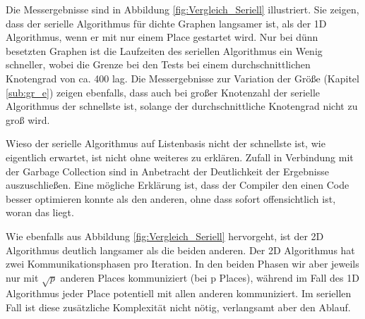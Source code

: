 Die Messergebnisse sind in Abbildung \ref{fig:Vergleich_Seriell} illustriert. Sie zeigen, dass der serielle Algorithmus für dichte Graphen langsamer ist, als der 1D Algorithmus, wenn er mit nur einem Place gestartet wird. Nur bei dünn besetzten Graphen ist die Laufzeiten des seriellen Algorithmus ein Wenig schneller, wobei die Grenze bei den Tests bei einem durchschnittlichen Knotengrad von ca. 400 lag. Die Messergebnisse zur Variation der Größe (Kapitel \ref{sub:gr_e}) zeigen ebenfalls, dass auch bei großer Knotenzahl der serielle Algorithmus der schnellste ist, solange der durchschnittliche Knotengrad nicht zu groß wird.

Wieso der serielle Algorithmus auf Listenbasis nicht der schnellste ist, wie eigentlich erwartet, ist nicht ohne weiteres zu erklären. Zufall in Verbindung mit der Garbage Collection sind in Anbetracht der Deutlichkeit der Ergebnisse auszuschließen. Eine mögliche Erklärung ist, dass der Compiler den einen Code besser optimieren konnte als den anderen, ohne dass sofort offensichtlich ist, woran das liegt.

Wie ebenfalls aus Abbildung \ref{fig:Vergleich_Seriell} hervorgeht, ist der 2D Algorithmus deutlich langsamer als die beiden anderen. Der 2D Algorithmus hat zwei Kommunikationsphasen pro Iteration. In den beiden Phasen wir aber jeweils nur mit $\sqrt{p}$ anderen Places kommuniziert (bei p Places)\cite{Buluc:2011}, während im Fall des 1D Algorithmus jeder Place potentiell mit allen anderen kommuniziert. Im seriellen Fall ist diese zusätzliche Komplexität nicht nötig, verlangsamt aber den Ablauf.

